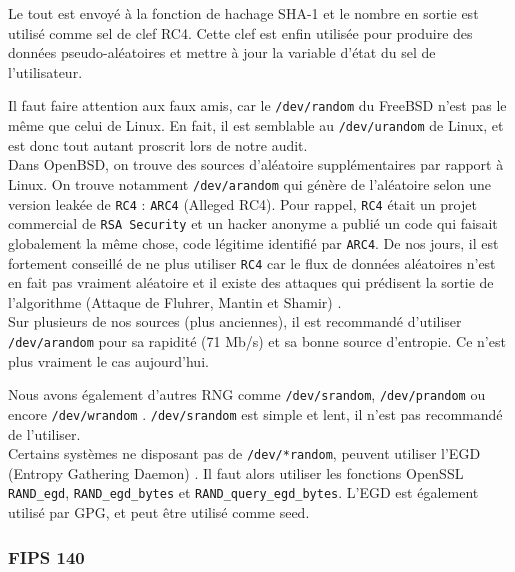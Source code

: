 			Le tout est envoyé à la fonction de hachage SHA-1 et le nombre en sortie est utilisé comme sel de clef RC4. Cette clef est enfin utilisée pour produire des données pseudo-aléatoires et mettre à jour la variable d'état du sel de l'utilisateur. 
			
			
			Il faut faire attention aux faux amis, car le \texttt{/dev/random} du FreeBSD n'est pas le même que celui de Linux. En fait, il est semblable au \texttt{/dev/urandom} de Linux, et est donc tout autant proscrit lors de notre audit.\\ 

			Dans OpenBSD, on trouve des sources d'aléatoire supplémentaires par rapport à Linux. On trouve notamment \texttt{/dev/arandom} qui génère de l'aléatoire selon une version leakée de \texttt{RC4} : \texttt{ARC4} (Alleged RC4). Pour rappel, \texttt{RC4} était un projet commercial de \texttt{RSA Security} et un hacker anonyme a publié un code qui faisait globalement la même chose, code légitime identifié par \texttt{ARC4}. De nos jours, il est fortement conseillé de ne plus utiliser \texttt{RC4} car le flux de données aléatoires n'est en fait pas vraiment aléatoire et il existe des attaques qui prédisent la sortie de l'algorithme (Attaque de Fluhrer, Mantin et Shamir) \nocite{Fluhrer01weaknessesin}.	\\
			
			
			Sur plusieurs de nos sources (plus anciennes), il est recommandé d'utiliser \texttt{/dev/arandom} pour sa rapidité (71 Mb/s) et sa bonne source d'entropie. Ce n'est plus vraiment le cas aujourd'hui.\\

	
		
			Nous avons également d'autres RNG comme \texttt{/dev/srandom}, \texttt{/dev/prandom} ou encore \texttt{/dev/wrandom} \cite{miros2013}. \texttt{/dev/srandom} est simple et lent, il n'est pas recommandé de l'utiliser.\\

			Certains systèmes ne disposant pas de \texttt{/dev/*random}, peuvent utiliser l'EGD (Entropy Gathering Daemon) \cite{egdsf.net}. Il faut alors utiliser les fonctions OpenSSL \texttt{RAND\_egd}, \texttt{RAND\_egd\_bytes} et \texttt{RAND\_query\_egd\_bytes}. L'EGD est également utilisé par GPG, et peut être utilisé comme seed.
			
	\subsubsection{FIPS 140}
	
